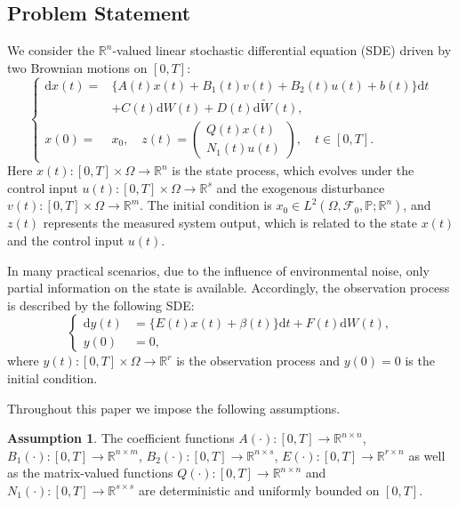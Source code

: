\documentclass[lettersize,journal]{IEEEtran}
\theoremstyle{plain}
\theoremstyle{definition}
\newtheorem{ass}{Assumption}
\begin{document}
\subsection{Problem Statement}
We consider the $\mathbb{R}^n$-valued linear stochastic differential equation (SDE) driven by two Brownian motions on $[0,T]$:
\begin{equation}\label{eq:2.1}
	\left\{
	\begin{aligned}
		\mathrm{d}x(t) =& \Big\{ A(t)x(t) + B_1(t)v(t) + B_2(t)u(t) + b(t) \Big\} \mathrm{d}t \\
		& + C(t)\mathrm{d}W(t) + D(t)\mathrm{d}\widetilde{W}(t),\\
		x(0)=&x_0,\quad 
		z(t)=
		\begin{pmatrix}
			Q(t)x(t)\\
			N_1(t)u(t)
		\end{pmatrix},\quad t \in [0,T].
	\end{aligned}
	\right.
\end{equation}
Here $x(t): [0,T] \times \Omega \rightarrow \mathbb{R}^n$ is the state process, which evolves under the control input $u(t): [0,T] \times \Omega \rightarrow \mathbb{R}^s$ and the exogenous disturbance $v(t): [0,T] \times \Omega \rightarrow \mathbb{R}^m$. The initial condition is $x_0 \in L^2(\Omega,\mathcal{F}_0,\mathbb{P};\mathbb{R}^n)$, and $z(t)$ represents the measured system output, which is related to the state $x(t)$ and the control input $u(t)$.

In many practical scenarios, due to the influence of environmental noise, only partial information on the state is available. Accordingly, the observation process is described by the following SDE:
\begin{equation}\label{eq:2.2}
	\left\{
	\begin{aligned}
		\mathrm{d}y(t) &= \Big\{ E(t)x(t) + \beta(t) \Big\}\mathrm{d}t + F(t)\mathrm{d}W(t),\\
		y(0) &= 0,
	\end{aligned}
	\right.
\end{equation}
where $y(t):[0,T]\times \Omega \rightarrow \mathbb{R}^r$ is the observation process and $y(0) = 0$ is the initial condition.

Throughout this paper we impose the following assumptions.

\begin{ass}\label{ass:2.1}
	The coefficient functions $A(\cdot) : [0,T] \rightarrow \mathbb{R}^{n \times n}$, $B_1(\cdot) : [0,T] \rightarrow \mathbb{R}^{n \times m}$, $B_2(\cdot) : [0,T] \rightarrow \mathbb{R}^{n \times s}$, $E(\cdot) : [0,T] \rightarrow \mathbb{R}^{r \times n}$ as well as the matrix-valued functions $Q(\cdot) : [0,T] \rightarrow \mathbb{R}^{n \times n}$ and $N_1(\cdot) : [0,T] \rightarrow \mathbb{R}^{s \times s}$ are deterministic and uniformly bounded on $[0,T]$.
\end{ass}
\end{document}
